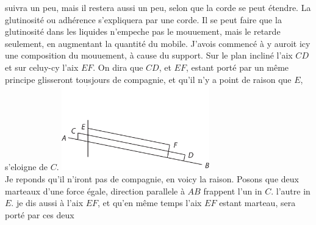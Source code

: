 suivra un peu, mais il restera aussi un peu, selon que la corde se peut \'{e}tendre.
La glutinosit\'{e}\protect{} ou adh\'{e}rence s'expliquera par une
corde. Il se peut faire que la glutinosit\'{e}\protect{} dans les liquides n'empeche pas le mouuement,
mais le retarde seulement, en augmentant la quantit\'{e} du mobile.
J'avois  commenc\'{e} \`{a}
y auroit icy une composition du mouuement,\protect{}
\`{a} cause du support. Sur le plan inclin\'{e}
  l'aix\protect{} $CD$ et sur celuy-cy l'aix\protect{} $EF$. On dira que $CD$, et $EF$, estant port\'{e} par un m\^{e}me  principe glisseront tousjours de compagnie, et qu'il n'y a point de raison que $E$, s'eloigne de $C$. 
\pend
\pstart
\centering 
\includegraphics[trim = 0mm 0mm 0mm 18mm, clip,width=0.48\textwidth]{images/LH037,03_86v-d1.pdf}\\
 \noindent {}
\pend
\newpage
\pstart
\noindent Je reponds qu'il n'iront pas de compagnie, en voicy la raison. Posons que deux marteaux d'une force \'{e}gale, direction parallele \`{a} $AB$ frappent l'un in $C.$ l'autre in $E.$
je dis
aussi \`{a} l'aix\protect{} $EF$,
et qu'en m\^{e}me temps l'aix\protect{} $EF$ estant
marteau, sera port\'{e} par ces deux
